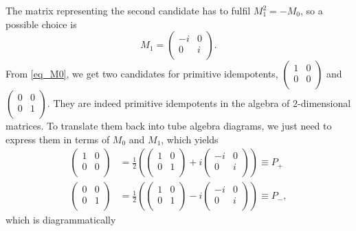 The matrix representing the second candidate has to fulfil $M_1^2=-M_0$, so a possible choice is
	\begin{equation}
		M_1=\begin{pmatrix}
			-i & 0\\
			0 & i\\
		\end{pmatrix}.
	\end{equation}
From \eqref{eq_M0}, we get two candidates for primitive idempotents, $\begin{pmatrix} 1 & 0\\ 0 & 0\\ \end{pmatrix}$ and $\begin{pmatrix} 0 & 0\\ 0 & 1\\ \end{pmatrix}$. They are indeed primitive idempotents in the algebra of $2$-dimensional matrices. To translate them back into tube algebra diagrams, we just need to express them in terms of $M_0$ and $M_1$, which yields
	\begin{align}
		\begin{pmatrix} 1 & 0\\ 0 & 0\\ \end{pmatrix}&=\frac{1}{2}\left( \begin{pmatrix} 1 & 0\\ 0 & 1\\ \end{pmatrix}+i \begin{pmatrix} -i & 0\\ 0 & i\\ \end{pmatrix}\right)\equiv P_+\\
		\begin{pmatrix} 0 & 0\\ 0 & 1\\ \end{pmatrix}&=\frac{1}{2}\left( \begin{pmatrix} 1 & 0\\ 0 & 1\\ \end{pmatrix}-i \begin{pmatrix} -i & 0\\ 0 & i\\ \end{pmatrix}\right)\equiv P_-,
	\end{align}
which is diagrammatically
